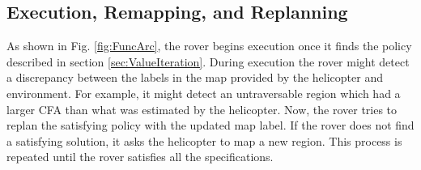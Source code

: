 \documentclass[letterpaper]{article} %
\newcommand{\sofie}[1]{{\color{purple} [Sofie] #1}}
\begin{document}


\subsection{Execution, Remapping, and Replanning}
\label{sec:replanning}

As shown in Fig. \ref{fig:FuncArc}, the rover begins execution once it finds the policy described in section \ref{sec:ValueIteration}. 
During execution the rover might detect a discrepancy between the labels in the map provided by the helicopter and environment. 
For example, it might detect an untraversable region which had a larger CFA than what was estimated by the helicopter. 
Now, the rover tries to replan the satisfying policy with the updated map label. If the rover does not find a satisfying solution, it asks the helicopter to map a new region. This process is repeated until the rover satisfies all the specifications.

\end{document}
